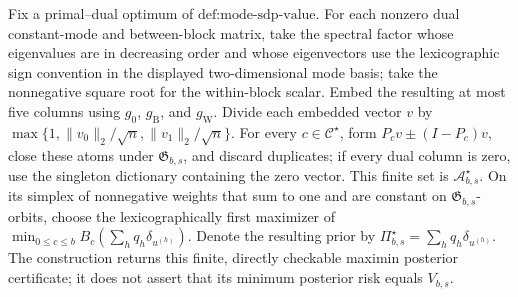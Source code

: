 Fix a primal--dual optimum of \(\text{def:mode-sdp-value}\). For each nonzero dual constant-mode and between-block matrix, take the spectral factor whose eigenvalues are in decreasing order and whose eigenvectors use the lexicographic sign convention in the displayed two-dimensional mode basis; take the nonnegative square root for the within-block scalar. Embed the resulting at most five columns using \(g_0\), \(g_{\mathrm B}\), and \(g_{\mathrm W}\). Divide each embedded vector \(v\) by \(\max\{1,\|v_0\|_2/\sqrt n,\|v_1\|_2/\sqrt n\}\). For every \(c\in\mathcal C^{\star}\), form \(P_cv\pm(I-P_c)v\), close these atoms under \(\mathfrak G_{b,s}\), and discard duplicates; if every dual column is zero, use the singleton dictionary containing the zero vector. This finite set is \(\mathcal A_{b,s}^{\star}\). On its simplex of nonnegative weights that sum to one and are constant on \(\mathfrak G_{b,s}\)-orbits, choose the lexicographically first maximizer of \(\min_{0\le c\le b}B_c(\sum_hq_h\delta_{u^{(h)}})\). Denote the resulting prior by \(\Pi_{b,s}^{\star}=\sum_hq_h\delta_{u^{(h)}}\). The construction returns this finite, directly checkable maximin posterior certificate; it does not assert that its minimum posterior risk equals \(V_{b,s}\).